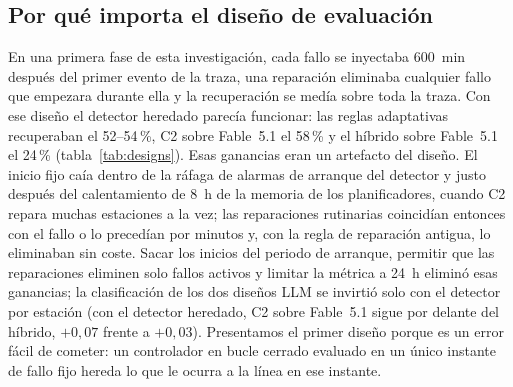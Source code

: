 \documentclass[preprint,11pt]{elsarticle}
\begin{document}
\begin{table}[t]
\centering
\caption{Proporción de los candidatos del test de cambio que veta cada híbrido, según el número de estaciones que nombra la alarma que dispara la llamada, desde el inicio del fallo; trazas reservadas, detector por estación. Recalculado reproduciendo las decisiones almacenadas. Entre corchetes: intervalo al 95\,\% por bootstrap de los 24 grupos de traza y estación averiada; $n$: candidatos de la estación averiada.}
\label{tab:vetosize}
\small
{}
\end{table}

\subsection{Por qué importa el diseño de evaluación}
\label{sec:designs}
En una primera fase de esta investigación, cada fallo se inyectaba 600~min después del primer evento de la traza, una reparación eliminaba cualquier fallo que empezara durante ella y la recuperación se medía sobre toda la traza. Con ese diseño el detector heredado parecía funcionar: las reglas adaptativas recuperaban el 52--54\,\%, C2 sobre Fable~5.1 el 58\,\% y el híbrido sobre Fable~5.1 el 24\,\% (tabla~\ref{tab:designs}). Esas ganancias eran un artefacto del diseño. El inicio fijo caía dentro de la ráfaga de alarmas de arranque del detector y justo después del calentamiento de 8~h de la memoria de los planificadores, cuando C2 repara muchas estaciones a la vez; las reparaciones rutinarias coincidían entonces con el fallo o lo precedían por minutos y, con la regla de reparación antigua, lo eliminaban sin coste. Sacar los inicios del periodo de arranque, permitir que las reparaciones eliminen solo fallos activos y limitar la métrica a 24~h eliminó esas ganancias; la clasificación de los dos diseños LLM se invirtió solo con el detector por estación (con el detector heredado, C2 sobre Fable~5.1 sigue por delante del híbrido, $+0{,}07$ frente a $+0{,}03$). Presentamos el primer diseño porque es un error fácil de cometer: un controlador en bucle cerrado evaluado en un único instante de fallo fijo hereda lo que le ocurra a la línea en ese instante.
\end{document}

